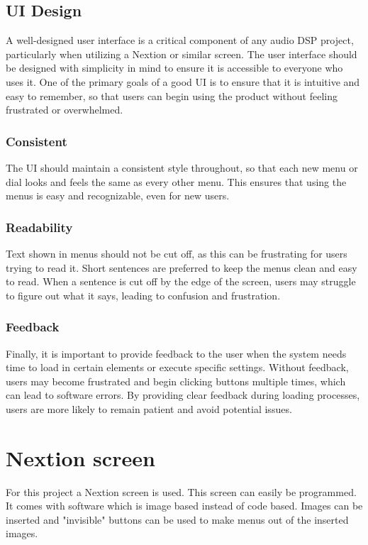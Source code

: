 \subsection*{UI Design} \label{UI_Design}
A well-designed user interface is a critical component of any audio DSP project, particularly when utilizing a Nextion or similar screen. The user interface should be designed with simplicity in mind to ensure it is accessible to everyone who uses it. One of the primary goals of a good UI is to ensure that it is intuitive and easy to remember, so that users can begin using the product without feeling frustrated or overwhelmed.

\subsubsection*{Consistent}
The UI should maintain a consistent style throughout, so that each new menu or dial looks and feels the same as every other menu. This ensures that using the menus is easy and recognizable, even for new users.

\subsubsection*{Readability}
Text shown in menus should not be cut off, as this can be frustrating for users trying to read it. Short sentences are preferred to keep the menus clean and easy to read. When a sentence is cut off by the edge of the screen, users may struggle to figure out what it says, leading to confusion and frustration.

\subsubsection*{Feedback}
Finally, it is important to provide feedback to the user when the system needs time to load in certain elements or execute specific settings. Without feedback, users may become frustrated and begin clicking buttons multiple times, which can lead to software errors. By providing clear feedback during loading processes, users are more likely to remain patient and avoid potential issues.

\section{Nextion screen}

For this project a Nextion screen is used. This screen can easily be programmed. It comes with software which is image based instead of code based. Images can be inserted and "invisible" buttons can be used to make menus out of the inserted images.

